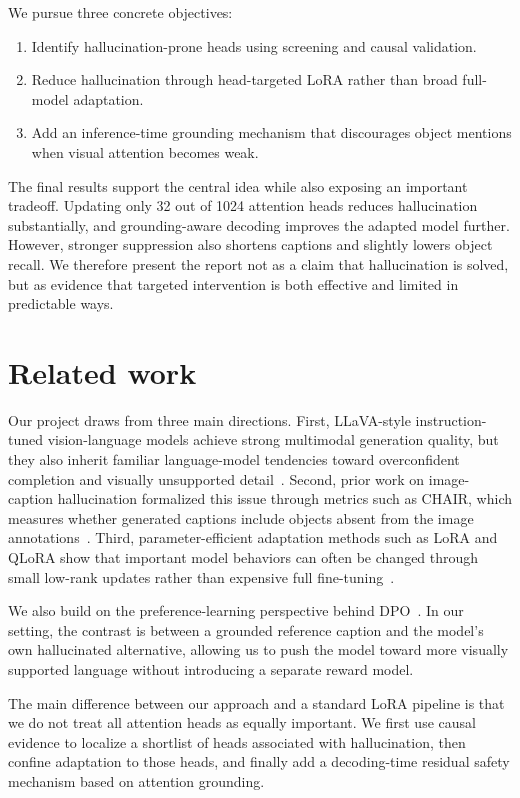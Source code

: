 \documentclass[10pt,twocolumn]{article}
\begin{document}
We pursue three concrete objectives:
\begin{enumerate}
  \item Identify hallucination-prone heads using screening and causal validation.
  \item Reduce hallucination through head-targeted LoRA rather than broad full-model adaptation.
  \item Add an inference-time grounding mechanism that discourages object mentions when visual attention becomes weak.
\end{enumerate}

The final results support the central idea while also exposing an important tradeoff. Updating only 32 out of 1024 attention heads reduces hallucination substantially, and grounding-aware decoding improves the adapted model further. However, stronger suppression also shortens captions and slightly lowers object recall. We therefore present the report not as a claim that hallucination is solved, but as evidence that targeted intervention is both effective and limited in predictable ways.

\section{Related work}
Our project draws from three main directions. First, LLaVA-style instruction-tuned vision-language models achieve strong multimodal generation quality, but they also inherit familiar language-model tendencies toward overconfident completion and visually unsupported detail~\cite{liu2024llava}. Second, prior work on image-caption hallucination formalized this issue through metrics such as CHAIR, which measures whether generated captions include objects absent from the image annotations~\cite{rohrbach2018object}. Third, parameter-efficient adaptation methods such as LoRA and QLoRA show that important model behaviors can often be changed through small low-rank updates rather than expensive full fine-tuning~\cite{hu2022lora,dettmers2024qlora}.

We also build on the preference-learning perspective behind DPO~\cite{rafailov2024dpo}. In our setting, the contrast is between a grounded reference caption and the model's own hallucinated alternative, allowing us to push the model toward more visually supported language without introducing a separate reward model.

The main difference between our approach and a standard LoRA pipeline is that we do not treat all attention heads as equally important. We first use causal evidence to localize a shortlist of heads associated with hallucination, then confine adaptation to those heads, and finally add a decoding-time residual safety mechanism based on attention grounding.
\end{document}
